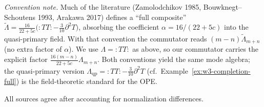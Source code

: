 \emph{Convention note.}  Much of the literature (Zamolodchikov 1985, Bouwknegt--Schoutens 1993, Arakawa 2017) defines a ``full composite'' $\widetilde{\Lambda} = \frac{16}{22+5c}\bigl({:}TT{:} - \frac{3}{10}\partial^2 T\bigr)$, absorbing the coefficient $\alpha = 16/(22+5c)$ into the quasi-primary field.  With that convention the commutator reads $(m-n)\widetilde{\Lambda}_{m+n}$ (no extra factor of $\alpha$).  We use $\Lambda = {:}TT{:}$ as above, so our commutator carries the explicit factor $\frac{16(m-n)}{22+5c}\Lambda_{m+n}$.  Both conventions yield the same mode algebra; the quasi-primary version $\Lambda_{\mathrm{qp}} = {:}TT{:} - \frac{3}{10}\partial^2 T$ (cf.\ Example~\ref{ex:w3-completion-full}) is the field-theoretic standard for the OPE.

All sources agree after accounting for normalization differences.
